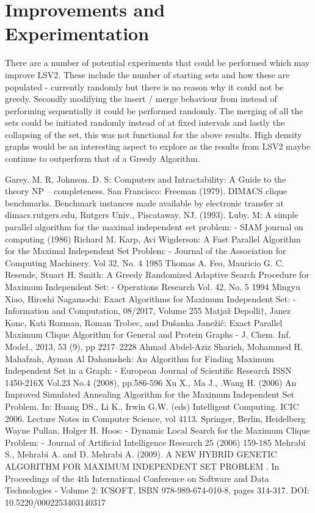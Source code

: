 \documentclass[conference]{IEEEtran}
\begin{document}
\section{Improvements and Experimentation}

There are a number of potential experiments that could be performed which may improve LSV2. These include the number of starting
sets  and how these are populated - currently randomly but there is no reason why it could not be greedy. Secondly modifying the
insert / merge behaviour from instead of performing sequentially it could be performed randomly. The merging of all the sets could be
initiated randomly instead of at fixed intervals and lastly the collapsing of the set, this was not functional for the above results.
High density graphs would be an interesting aspect to explore as the results from LSV2  maybe continue to outperform that of a Greedy Algorithm.


\begin{thebibliography}{00}
 Garey. M. R, Johnson. D. S: Computers and Intractability: A Guide to the theory NP – completeness. San Francisco: Freeman (1979).  
 DIMACS clique benchmarks. Benchmark instances made available by electronic transfer at dimacs.rutgers.edu, Rutgers Univ., Piscataway. NJ. (1993). 
 Luby. M: A simple parallel algorithm for the maximal independent set problem: - SIAM journal on computing (1986)
 Richard M. Karp, Avi Wigderson: A Fast Parallel Algorithm for the Maximal Independent Set Problem: - Journal of the Association for Computing Machinery. Vol 32, No. 4 1985
 Thomas A. Feo, Mauricio G. C. Resende, Stuart H. Smith: A Greedy Randomized Adaptive Search Procedure for Maximum Independent Set: - Operations Research Vol. 42, No. 5 1994
 Mingyu Xiao, Hiroshi Nagamochi: Exact Algorithms for Maximum Independent Set: - Information and Computation, 08/2017, Volume 255
 Matjaž Depolli†, Janez Konc, Kati Rozman, Roman Trobec, and Dušanka Janežič: Exact Parallel Maximum Clique Algorithm for General and Protein Graphs - J. Chem. Inf. Model., 2013, 53 (9), pp 2217–2228
 Ahmad Abdel-Aziz Sharieh, Mohammed H. Mahafzah, Ayman Al Dahamsheh: An Algorithm for Finding Maximum Independent Set in a Graph: - European Journal of Scientific Research ISSN 1450-216X Vol.23 No.4 (2008), pp.586-596
 Xu X., Ma J., .Wang H. (2006) An Improved Simulated Annealing Algorithm for the Maximum Independent Set Problem. In: Huang DS., Li K., Irwin G.W. (eds) Intelligent Computing. ICIC 2006. Lecture Notes in Computer Science, vol 4113. Springer, Berlin, Heidelberg
 Wayne Pullan, Holger H. Hoos: - Dynamic Local Search for the Maximum Clique Problem: - Journal of Artificial Intelligence Research 25 (2006) 159-185
 Mehrabi S., Mehrabi A. and D. Mehrabi A. (2009). A NEW HYBRID GENETIC ALGORITHM FOR MAXIMUM INDEPENDENT SET PROBLEM . In Proceedings of the 4th International Conference on Software and Data Technologies - Volume 2: ICSOFT, ISBN 978-989-674-010-8, pages 314-317. DOI: 10.5220/0002253403140317
\end{thebibliography}
\end{document}
